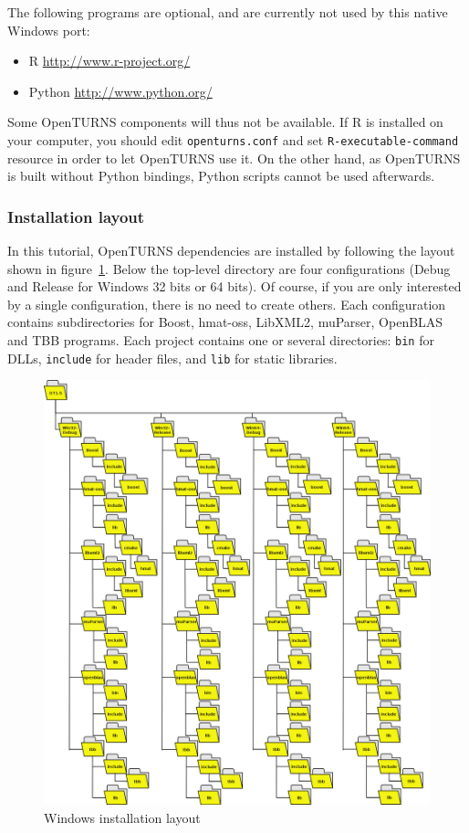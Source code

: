 The following programs are optional, and are currently not used by this native Windows port:
\begin{itemize}
\item R \url{http://www.r-project.org/}
\item Python \url{http://www.python.org/}
\end{itemize}
Some OpenTURNS components will thus not be available.  If R is installed on your computer, you should edit \texttt{openturns.conf} and set
\texttt{R-executable-command} resource in order to let OpenTURNS use it.  On the other hand, as OpenTURNS is built without Python bindings,
Python scripts cannot be used afterwards.

\subsubsection{Installation layout}

In this tutorial, OpenTURNS dependencies are installed by following the layout shown in figure~\ref{fig:win-inst-layout}.
Below the top-level directory are four configurations (Debug and Release for Windows 32 bits or 64 bits).  Of course,
if you are only interested by a single configuration, there is no need to create others.  Each configuration contains
subdirectories for Boost, hmat-oss, LibXML2, muParser, OpenBLAS and TBB programs.  Each project contains one or several
directories: \texttt{bin} for DLLs, \texttt{include} for header files, and \texttt{lib} for static libraries.

\begin{figure}[p]
\begin{center}
\includegraphics[scale=0.33]{Figures/win_native/win-inst-layout.png}
\caption{Windows installation layout}\label{fig:win-inst-layout}
\end{center}
\end{figure}

